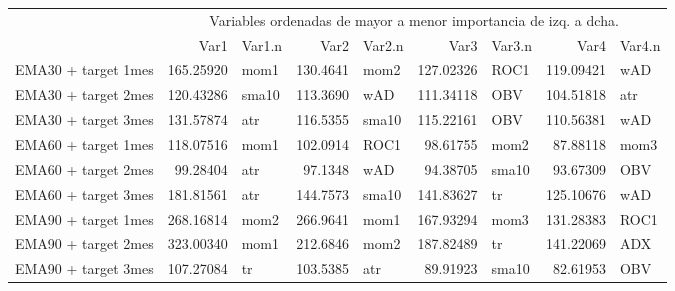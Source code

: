 \documentclass[]{article}
\newenvironment{Shaded}{\begin{snugshade}}{\end{snugshade}}
\newcommand{\CommentTok}[1]{\textcolor[rgb]{0.56,0.35,0.01}{\textit{#1}}}
\begin{document}
\begin{table}[H]
\centering\begingroup\fontsize{10}{12}\selectfont

\begin{tabular}{l|r|l|r|l|r|l|r|l}
\hline
\multicolumn{1}{c|}{ } & \multicolumn{8}{|c}{Variables ordenadas de mayor a menor importancia de izq. a dcha.} \\
\cline{2-9}
  & Var1 & Var1.n & Var2 & Var2.n & Var3 & Var3.n & Var4 & Var4.n\\
\hline
EMA30 + target 1mes & 165.25920 & mom1 & 130.4641 & mom2 & 127.02326 & ROC1 & 119.09421 & wAD\\
\hline
EMA30 + target 2mes & 120.43286 & sma10 & 113.3690 & wAD & 111.34118 & OBV & 104.51818 & atr\\
\hline
EMA30 + target 3mes & 131.57874 & atr & 116.5355 & sma10 & 115.22161 & OBV & 110.56381 & wAD\\
\hline
EMA60 + target 1mes & 118.07516 & mom1 & 102.0914 & ROC1 & 98.61755 & mom2 & 87.88118 & mom3\\
\hline
EMA60 + target 2mes & 99.28404 & atr & 97.1348 & wAD & 94.38705 & sma10 & 93.67309 & OBV\\
\hline
EMA60 + target 3mes & 181.81561 & atr & 144.7573 & sma10 & 141.83627 & tr & 125.10676 & wAD\\
\hline
EMA90 + target 1mes & 268.16814 & mom2 & 266.9641 & mom1 & 167.93294 & mom3 & 131.28383 & ROC1\\
\hline
EMA90 + target 2mes & 323.00340 & mom1 & 212.6846 & mom2 & 187.82489 & tr & 141.22069 & ADX\\
\hline
EMA90 + target 3mes & 107.27084 & tr & 103.5385 & atr & 89.91923 & sma10 & 82.61953 & OBV\\
\hline
\end{tabular}\endgroup{}
\end{table}

\begin{Shaded}
\end{Shaded}
\end{document}
